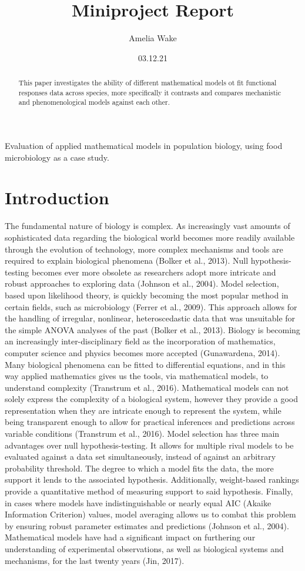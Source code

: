 \documentclass[11pt]{article}
\title{Miniproject Report}
\author{Amelia Wake}
\date{03.12.21}
\begin{document}
  \maketitle
    Evaluation of applied mathematical models in population biology, using food microbiology as a case study. 
    
  \begin{abstract}
    This paper investigates the ability of different mathematical models ot fit functional responses data across species, more specifically it contrasts and compares mechanistic and phenomenological models against each other. 
  \end{abstract}
  
  \section{Introduction}
    The fundamental nature of biology is complex. As increasingly vast amounts of sophisticated data regarding the biological world becomes more readily available through the evolution of technology, more complex mechanisms and tools are required to explain biological phenomena (Bolker et al., 2013). Null hypothesis-testing becomes ever more obsolete as researchers adopt more intricate and robust approaches to exploring data (Johnson et al., 2004). Model selection, based upon likelihood theory, is quickly becoming the most popular method in certain fields, such as microbiology (Ferrer et al., 2009). This approach allows for the handling of irregular, nonlinear, heteroscedastic data that was unsuitable for the simple ANOVA analyses of the past (Bolker et al., 2013). Biology is becoming an increasingly inter-disciplinary field as the incorporation of mathematics, computer science and physics becomes more accepted (Gunawardena, 2014). Many biological phenomena can be fitted to differential equations, and in this way applied mathematics gives us the tools, via mathematical models, to understand complexity (Transtrum et al., 2016). Mathematical models can not solely express the complexity of a biological system, however they provide a good representation when they are intricate enough to represent the system, while being transparent enough to allow for practical inferences and predictions across variable conditions (Transtrum et al., 2016). Model selection has three main advantages over null hypothesis-testing. It allows for multiple rival models to be evaluated against a data set simultaneously, instead of against an arbitrary probability threshold. The degree to which a model fits the data, the more support it lends to the associated hypothesis. Additionally, weight-based rankings provide a quantitative method of measuring support to said hypothesis. Finally, in cases where models have indistinguishable or nearly equal AIC (Akaike Information Criterion) values, model averaging allows us to combat this problem by ensuring robust parameter estimates and predictions (Johnson et al., 2004). Mathematical models have had a significant impact on furthering our understanding of experimental observations, as well as biological systems and mechanisms, for the last twenty years (Jin, 2017). 
  
\end{document}
